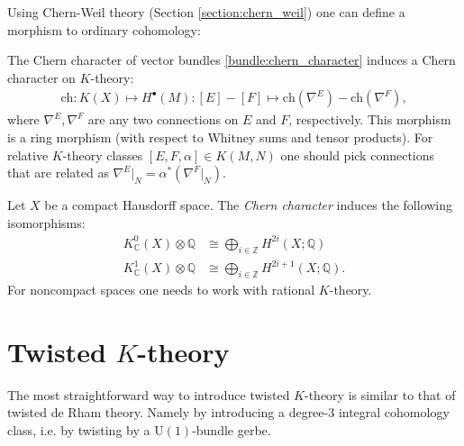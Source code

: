{    Using Chern-Weil theory (Section \ref{section:chern_weil}) one can define a morphism to ordinary cohomology:
    \begin{construct}\label{k:chern_character}
        The Chern character of vector bundles \ref{bundle:chern_character} induces a Chern character on $K$-theory:
        \begin{gather}
            \mathrm{ch}:K(X)\mapsto H^\bullet(M):[E]-[F]\mapsto \mathrm{ch}(\nabla^E)-\mathrm{ch}(\nabla^F),
        \end{gather}
        where $\nabla^E,\nabla^F$ are any two connections on $E$ and $F$, respectively. This morphism is a ring morphism (with respect to Whitney sums and tensor products). For relative $K$-theory classes $[E,F,\alpha]\in K(M,N)$ one should pick connections that are related as $\nabla^E|_N=\alpha^*(\nabla^F|_N)$.
    \end{construct}
    \begin{theorem}
        Let $X$ be a compact Hausdorff space. The \textit{Chern character} induces the following isomorphisms:
        \begin{align}
            K^0_\mathbb{C}(X)\otimes\mathbb{Q}&\cong\bigoplus_{i\in\mathbb{Z}}H^{2i}(X;\mathbb{Q})\\
            K^1_\mathbb{C}(X)\otimes\mathbb{Q}&\cong\bigoplus_{i\in\mathbb{Z}}H^{2i+1}(X;\mathbb{Q}).
        \end{align}
        For noncompact spaces one needs to work with rational $K$-theory.
    \end{theorem}

\section{\texorpdfstring{Twisted $K$-theory}{Twisted K-theory}}

    The most straightforward way to introduce twisted $K$-theory is similar to that of twisted de Rham theory. Namely by introducing a degree-3 integral cohomology class, i.e. by twisting by a $\mathrm{U}(1)$-bundle gerbe.

}
